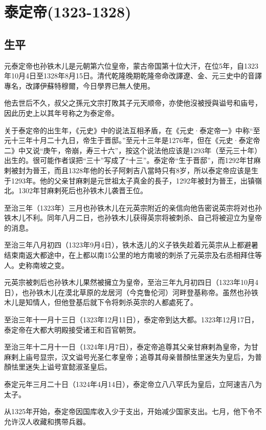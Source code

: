 
\section{泰定帝\tiny(1323-1328)}

\subsection{生平}

元泰定帝也孙铁木儿是元朝第六位皇帝，蒙古帝国第十位大汗，在位5年，自1323年10月4日至1328年8月15日。清代乾隆晚期乾隆帝命改譯遼、金、元三史中的音譯專名，改譯伊蘇特穆爾，今日學界已無人使用。

他去世后不久，叔父之孫元文宗打敗其子元天顺帝，亦使他沒被授與谥号和庙号，因此历史上以其年号称之为泰定帝。

关于泰定帝的出生年，《元史》中的说法互相矛盾，在《元史·泰定帝一》中称“至元十三年十月二十九日，帝生于晋邸。”至元十三年是1276年，但在《元史·泰定帝二》中又说“庚午，帝崩，寿三十六”，按这个说法他应该是1293年（至元三十年）出生的。很可能作者误把“三十”写成了“十三”。泰定帝“生于晋邸”，而1292年甘麻剌被封为晉王，而且1328年他的长子阿剌吉八當時只有8岁，所以泰定帝应该是生于1293年。他的父亲甘麻剌是元世祖太子真金的長子，1292年被封为晉王，出镇嶺北。1302年甘麻剌死后也孙铁木儿袭晋王位。

至治三年（1323年）三月也孙铁木儿在元英宗附近的亲信向他告密说英宗将对也孙铁木儿不利。同年八月二日，也孙铁木儿获得英宗将被刺杀、自己将被迎立为皇帝的消息。

至治三年八月初四（1323年9月4日），铁木迭儿的义子铁失趁着元英宗从上都避暑结束南返大都途中，在上都以南15公里的地方南坡的刺杀了元英宗及右丞相拜住等人。史称南坡之变。

元英宗被刺后也孙铁木儿果然被擁立为皇帝，至治三年九月初四日（1323年10月4日），也孙铁木儿在漠北草原的龙居河（今克鲁伦河）河畔登基称帝。虽然也孙铁木儿是知情人，但他登基后就下令将刺杀英宗的人都處死了。

至治三年十一月十三日（1323年12月11日），泰定帝到达大都。1323年12月17日，泰定帝在大都大明殿接受诸王和百官朝贺。

至治三年十二月十一日（1324年1月7日），泰定帝追尊其父亲甘麻剌為皇帝，为甘麻剌上庙号显宗，汉文谥号光圣仁孝皇帝；追尊其母亲普顏怯里迷失为皇后，为普顏怯里迷失上谥号宣懿淑圣皇后。

泰定元年三月二十日（1324年4月14日），泰定帝立八八罕氏为皇后，立阿速吉八为太子。

从1325年开始，泰定帝因国库收入少于支出，开始减少国家支出。七月，他下令不允许汉人收藏和携带兵器。

